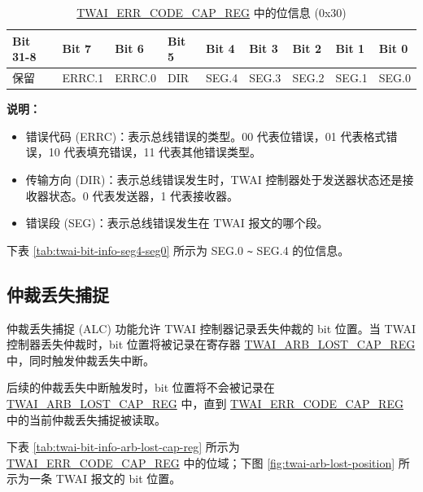 \documentclass[main\_\_CN.tex]{subfiles}
\begin{document}
\begin{longtable}[c]{|p{1.4cm}|p{1.4cm}|p{1.4cm}|p{1.4cm}|p{1.4cm}|p{1.4cm}|p{1.4cm}|p{1.4cm}|p{1.4cm}|}
    \caption{\hyperref[regdesc:TWAIERRCODECAPREG]{TWAI\_ERR\_CODE\_CAP\_REG} 中的位信息 (0x30)}
    \label{tab:twai-bit-info-error-code-cap-reg-reg-cn}\\
    \hline
    \rowcolor{lightgray}
    \textbf{Bit 31-8} & \textbf{Bit 7} & \textbf{Bit 6} & \textbf{Bit 5} & \textbf{Bit 4} & \textbf{Bit 3} & \textbf{Bit 2} & \textbf{Bit 1} & \textbf{Bit 0}\\\hline
    保留 & ERRC.1 & ERRC.0 & DIR & SEG.4 & SEG.3 & SEG.2 & SEG.1 & SEG.0\\
    \hline
\end{longtable}
\vspace{-1.5em}
{\bfseries 说明：}\\
\begin{itemize}
    \item 错误代码 (ERRC)：表示总线错误的类型。00 代表位错误，01 代表格式错误，10 代表填充错误，11 代表其他错误类型。
    \item 传输方向 (DIR)：表示总线错误发生时，TWAI 控制器处于发送器状态还是接收器状态。0 代表发送器，1 代表接收器。
    \item 错误段 (SEG)：表示总线错误发生在 TWAI 报文的哪个段。
\end{itemize}

下表 \ref{tab:twai-bit-info-seg4-seg0} 所示为 SEG.0 \verb+~+ SEG.4 的位信息。



\subsection{仲裁丢失捕捉}

仲裁丢失捕捉 (ALC) 功能允许 TWAI 控制器记录丢失仲裁的 bit 位置。当 TWAI 控制器丢失仲裁时，bit 位置将被记录在寄存器 \hyperref[regdesc:TWAIARBLOSTCAPREG]{TWAI\_ARB\_LOST\_CAP\_REG} 中，同时触发仲裁丢失中断。

后续的仲裁丢失中断触发时，bit 位置将不会被记录在 \hyperref[regdesc:TWAIARBLOSTCAPREG]{TWAI\_ARB\_LOST\_CAP\_REG} 中，直到 \hyperref[regdesc:TWAIERRCODECAPREG]{TWAI\_ERR\_CODE\_CAP\_REG} 中的当前仲裁丢失捕捉被读取。

下表 \ref{tab:twai-bit-info-arb-lost-cap-reg} 所示为 \hyperref[regdesc:TWAIERRCODECAPREG]{TWAI\_ERR\_CODE\_CAP\_REG} 中的位域；下图 \ref{fig:twai-arb-lost-position} 所示为一条 TWAI 报文的 bit 位置。
\end{document}

